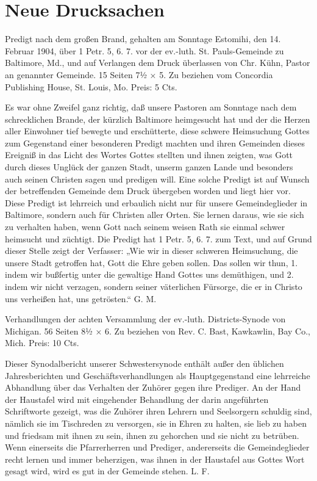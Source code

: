 \chapter{Neue Drucksachen}

Predigt nach dem großen Brand, gehalten am Sonntage Estomihi, den 14. Februar 1904, über 1 Petr. 5, 6. 7. vor der ev.-luth. St. Pauls-Gemeinde zu Baltimore, Md., und auf Verlangen dem Druck überlassen von Chr. Kühn, Pastor an genannter Gemeinde. 15 Seiten 7½ × 5. Zu beziehen vom Concordia Publishing House, St. Louis, Mo. Preis: 5 Cts.

Es war ohne Zweifel ganz richtig, daß unsere Pastoren am Sonntage nach dem schrecklichen Brande, der kürzlich Baltimore heimgesucht hat und der die Herzen aller Einwohner tief bewegte und erschütterte, diese schwere Heimsuchung Gottes zum Gegenstand einer besonderen Predigt machten und ihren Gemeinden dieses Ereigniß in das Licht des Wortes Gottes stellten und ihnen zeigten, was Gott durch dieses Unglück der ganzen Stadt, unserm ganzen Lande und besonders auch seinen Christen sagen und predigen will. Eine solche Predigt ist auf Wunsch der betreffenden Gemeinde dem Druck übergeben worden und liegt hier vor. Diese Predigt ist lehrreich und erbaulich nicht nur für unsere Gemeindeglieder in Baltimore, sondern auch für Christen aller Orten. Sie lernen daraus, wie sie sich zu verhalten haben, wenn Gott nach seinem weisen Rath sie einmal schwer heimsucht und züchtigt. Die Predigt hat 1 Petr. 5, 6. 7. zum Text, und auf Grund dieser Stelle zeigt der Verfasser: „Wie wir in dieser schweren Heimsuchung, die unsere Stadt getroffen hat, Gott die Ehre geben sollen. Das sollen wir thun, 1. indem wir bußfertig unter die gewaltige Hand Gottes uns demüthigen, und 2. indem wir nicht verzagen, sondern seiner väterlichen Fürsorge, die er in Christo uns verheißen hat, uns getrösten.“ G. M.

Verhandlungen der achten Versammlung der ev.-luth. Districts-Synode von Michigan. 56 Seiten 8½ × 6. Zu beziehen von Rev. C. Bast, Kawkawlin, Bay Co., Mich. Preis: 10 Cts.

Dieser Synodalbericht unserer Schwestersynode enthält außer den üblichen Jahresberichten und Geschäftsverhandlungen als Hauptgegenstand eine lehrreiche Abhandlung über das Verhalten der Zuhörer gegen ihre Prediger. An der Hand der Haustafel wird mit eingehender Behandlung der darin angeführten Schriftworte gezeigt, was die Zuhörer ihren Lehrern und Seelsorgern schuldig sind, nämlich sie im Tischreden zu versorgen, sie in Ehren zu halten, sie lieb zu haben und friedsam mit ihnen zu sein, ihnen zu gehorchen und sie nicht zu betrüben. Wenn einerseits die Pfarrerherren und Prediger, andererseits die Gemeindeglieder recht lernen und immer beherzigen, was ihnen in der Haustafel aus Gottes Wort gesagt wird, wird es gut in der Gemeinde stehen. L. F.

